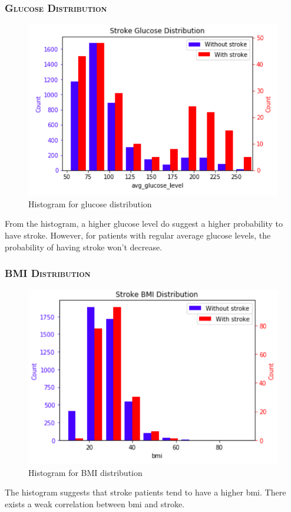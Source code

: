 \documentclass[a4paper,12pt]{article}
\begin{document}
\subsubsection{\textsc{Glucose Distribution}}
\begin{figure}[h] 
    \centering
    \includegraphics[width=.7\textwidth]{uni_p4} 
    \caption{Histogram for glucose distribution} 
\end{figure}
From the histogram, a higher glucose level do suggest a higher probability  to have stroke. However, for patients with regular average glucose levels, the probability of having stroke won't decrease.

\subsubsection{\textsc{BMI Distribution}}
\begin{figure}[h] 
    \centering
    \includegraphics[width=.7\textwidth]{uni_p5} 
    \caption{Histogram for BMI distribution} 
\end{figure}
The histogram suggests that stroke patients tend to have a higher bmi. There exists a weak correlation between bmi and stroke.
\end{document}
